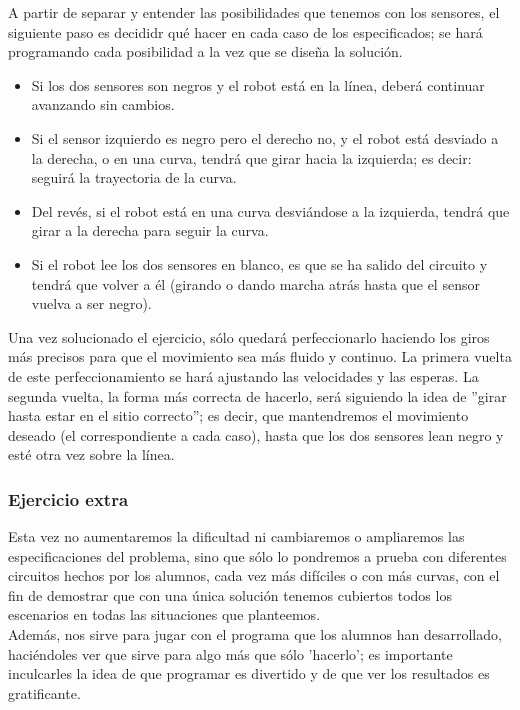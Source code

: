A partir de separar y entender las posibilidades que tenemos con los sensores, el siguiente paso es decididr qué hacer en cada caso de los especificados; se hará programando cada posibilidad a la vez que se diseña la solución.
\begin{itemize}
	\item Si los dos sensores son negros y el robot está en la línea, deberá continuar avanzando sin cambios.
	\item Si el sensor izquierdo es negro pero el derecho no, y el robot está desviado a la derecha, o en una curva, tendrá que girar hacia la izquierda; es decir: seguirá la trayectoria de la curva.
	\item Del revés, si el robot está en una curva desviándose a la izquierda, tendrá que girar a la derecha para seguir la curva.
	\item Si el robot lee los dos sensores en blanco, es que se ha salido del circuito y tendrá que volver a él (girando o dando marcha atrás hasta que el sensor vuelva a ser negro).
\end{itemize}
Una vez solucionado el ejercicio, sólo quedará perfeccionarlo haciendo los giros más precisos para que el movimiento sea más fluido y continuo. La primera vuelta de este perfeccionamiento se hará ajustando las velocidades y las esperas. La segunda vuelta, la forma más correcta de hacerlo, será siguiendo la idea de ''girar hasta estar en el sitio correcto''; es decir, que mantendremos el movimiento deseado (el correspondiente a cada caso), hasta que los dos sensores lean negro y esté otra vez sobre la línea.

\subsubsection{Ejercicio extra}
Esta vez no aumentaremos la dificultad ni cambiaremos o ampliaremos las especificaciones del problema, sino que sólo lo pondremos a prueba con diferentes circuitos hechos por los alumnos, cada vez más difíciles o con más curvas, con el fin de demostrar que con una única solución tenemos cubiertos todos los escenarios en todas las situaciones que planteemos. \\
Además, nos sirve para jugar con el programa que los alumnos han desarrollado, haciéndoles ver que sirve para algo más que sólo 'hacerlo'; es importante inculcarles la idea de que programar es divertido y de que ver los resultados es gratificante.

